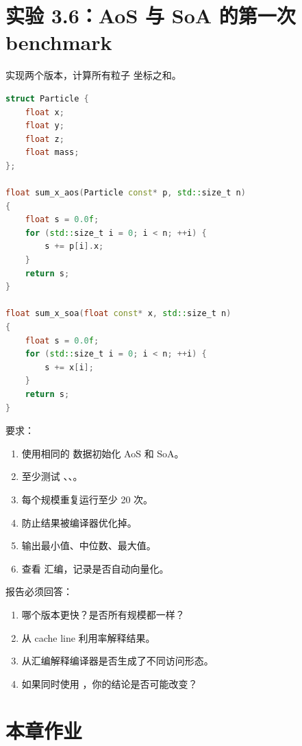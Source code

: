 \section{实验 3.6：AoS 与 SoA 的第一次 benchmark}

\begin{labbox}
实现两个版本，计算所有粒子  坐标之和。

\begin{lstlisting}[language=C++]
struct Particle {
    float x;
    float y;
    float z;
    float mass;
};

float sum_x_aos(Particle const* p, std::size_t n)
{
    float s = 0.0f;
    for (std::size_t i = 0; i < n; ++i) {
        s += p[i].x;
    }
    return s;
}

float sum_x_soa(float const* x, std::size_t n)
{
    float s = 0.0f;
    for (std::size_t i = 0; i < n; ++i) {
        s += x[i];
    }
    return s;
}
\end{lstlisting}

要求：

\begin{enumerate}
  \item 使用相同的  数据初始化 AoS 和 SoA。
  \item 至少测试 、、。
  \item 每个规模重复运行至少 20 次。
  \item 防止结果被编译器优化掉。
  \item 输出最小值、中位数、最大值。
  \item 查看  汇编，记录是否自动向量化。
\end{enumerate}

报告必须回答：

\begin{enumerate}
  \item 哪个版本更快？是否所有规模都一样？
  \item 从 cache line 利用率解释结果。
  \item 从汇编解释编译器是否生成了不同访问形态。
  \item 如果同时使用 ，你的结论是否可能改变？
\end{enumerate}
\end{labbox}

\section{本章作业}

